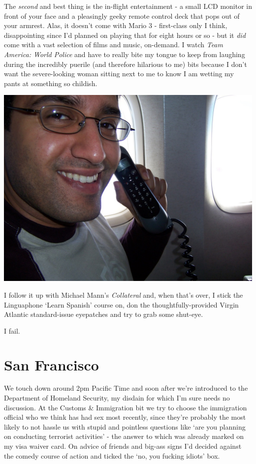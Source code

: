 \documentclass[a5paper,titlepage,11pt]{book}
\begin{document}
The \emph{second} and best thing is the in-flight entertainment - a small LCD monitor in front of your face and a pleasingly geeky remote control deck that pops out of your armrest. Alas, it doesn't come with Mario 3 - first-class only I think, disappointing since I'd planned on playing that for eight hours or so - but it \emph{did} come with a vast selection of films and music, on-demand. I watch \emph{Team America: World Police} and have to really bite my tongue to keep from laughing during the incredibly puerile (and therefore hilarious to me) bits because I don't want the severe-looking woman sitting next to me to know I am wetting my pants at something so childish.

\begin{center}\includegraphics[width=\textwidth]{gfx/100_0991}\end{center}

I follow it up with Michael Mann's \emph{Collateral} and, when that's over, I stick the Linguaphone `Learn Spanish' course on, don the thoughtfully-provided Virgin Atlantic standard-issue eyepatches and try to grab some shut-eye.

I fail.

\section*{San Francisco}
We touch down around 2pm Pacific Time and soon after we're introduced to the Department of Homeland Security, my disdain for which I'm sure needs no discussion. At the Customs \& Immigration bit we try to choose the immigration official who we think has had sex most recently, since they're probably the most likely to not hassle us with stupid and pointless questions like `are you planning on conducting terrorist activities' - the answer to which was already marked on my visa waiver card. On advice of friends and big-ass signs I'd decided against the comedy course of action and ticked the `no, you fucking idiots' box.
\end{document}
